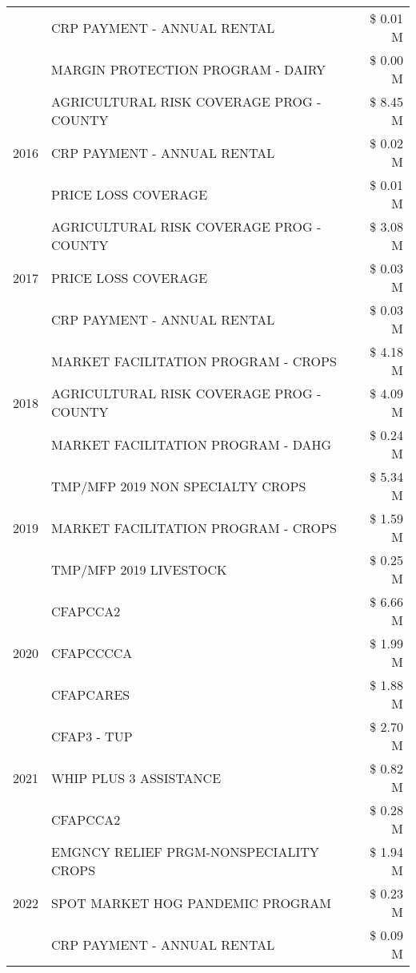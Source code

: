 \begin{tabular}{llr}
 & CRP PAYMENT - ANNUAL RENTAL & \$ 0.01 M \\
 & MARGIN PROTECTION PROGRAM - DAIRY & \$ 0.00 M \\
\cline{1-3}
\multirow[t]{3}{*}{2016} & AGRICULTURAL RISK COVERAGE PROG - COUNTY & \$ 8.45 M \\
 & CRP PAYMENT - ANNUAL RENTAL & \$ 0.02 M \\
 & PRICE LOSS COVERAGE & \$ 0.01 M \\
\cline{1-3}
\multirow[t]{3}{*}{2017} & AGRICULTURAL RISK COVERAGE PROG - COUNTY & \$ 3.08 M \\
 & PRICE LOSS COVERAGE & \$ 0.03 M \\
 & CRP PAYMENT - ANNUAL RENTAL & \$ 0.03 M \\
\cline{1-3}
\multirow[t]{3}{*}{2018} & MARKET FACILITATION PROGRAM - CROPS & \$ 4.18 M \\
 & AGRICULTURAL RISK COVERAGE PROG - COUNTY & \$ 4.09 M \\
 & MARKET FACILITATION PROGRAM - DAHG & \$ 0.24 M \\
\cline{1-3}
\multirow[t]{3}{*}{2019} & TMP/MFP 2019 NON SPECIALTY CROPS & \$ 5.34 M \\
 & MARKET FACILITATION PROGRAM - CROPS & \$ 1.59 M \\
 & TMP/MFP 2019 LIVESTOCK & \$ 0.25 M \\
\cline{1-3}
\multirow[t]{3}{*}{2020} & CFAPCCA2 & \$ 6.66 M \\
 & CFAPCCCCA & \$ 1.99 M \\
 & CFAPCARES & \$ 1.88 M \\
\cline{1-3}
\multirow[t]{3}{*}{2021} & CFAP3 - TUP & \$ 2.70 M \\
 & WHIP PLUS 3 ASSISTANCE & \$ 0.82 M \\
 & CFAPCCA2 & \$ 0.28 M \\
\cline{1-3}
\multirow[t]{3}{*}{2022} & EMGNCY RELIEF PRGM-NONSPECIALITY CROPS & \$ 1.94 M \\
 & SPOT MARKET HOG PANDEMIC PROGRAM & \$ 0.23 M \\
 & CRP PAYMENT - ANNUAL RENTAL & \$ 0.09 M \\
\cline{1-3}
\bottomrule
\end{tabular}
